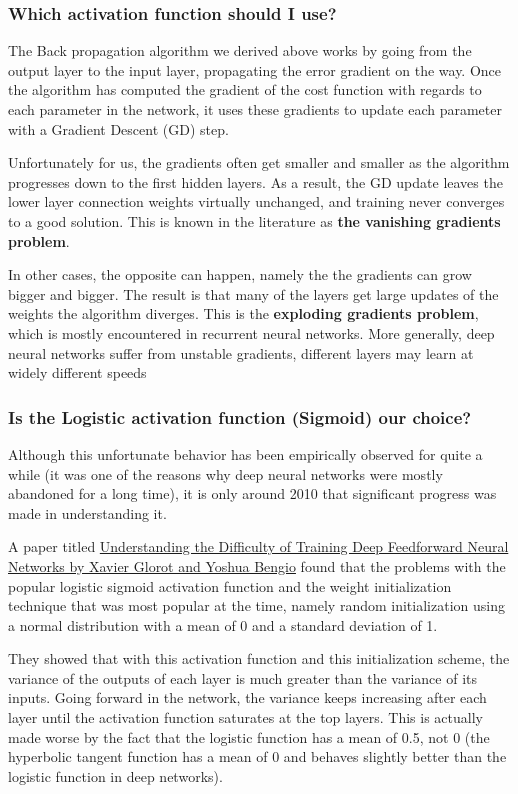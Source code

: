 \documentclass{beamer}
\begin{document}
\begin{frame}
\frametitle{Which activation function should I use?}

The Back propagation algorithm we derived above works by going from
the output layer to the input layer, propagating the error gradient on
the way. Once the algorithm has computed the gradient of the cost
function with regards to each parameter in the network, it uses these
gradients to update each parameter with a Gradient Descent (GD) step.

Unfortunately for us, the gradients often get smaller and smaller as
the algorithm progresses down to the first hidden layers. As a result,
the GD update leaves the lower layer connection weights virtually
unchanged, and training never converges to a good solution. This is
known in the literature as \textbf{the vanishing gradients problem}.

In other cases, the opposite can happen, namely the the gradients can
grow bigger and bigger. The result is that many of the layers get
large updates of the weights the algorithm diverges. This is the
\textbf{exploding gradients problem}, which is mostly encountered in
recurrent neural networks. More generally, deep neural networks suffer
from unstable gradients, different layers may learn at widely
different speeds
\end{frame}

\begin{frame}
\frametitle{Is the Logistic activation function (Sigmoid)  our choice?}

Although this unfortunate behavior has been empirically observed for
quite a while (it was one of the reasons why deep neural networks were
mostly abandoned for a long time), it is only around 2010 that
significant progress was made in understanding it.

A paper titled \href{{http://proceedings.mlr.press/v9/glorot10a.html}}{Understanding the Difficulty of Training Deep
Feedforward Neural Networks by Xavier Glorot and Yoshua Bengio} found that
the problems with the popular logistic
sigmoid activation function and the weight initialization technique
that was most popular at the time, namely random initialization using
a normal distribution with a mean of 0 and a standard deviation of
1. 

They showed that with this activation function and this
initialization scheme, the variance of the outputs of each layer is
much greater than the variance of its inputs. Going forward in the
network, the variance keeps increasing after each layer until the
activation function saturates at the top layers. This is actually made
worse by the fact that the logistic function has a mean of 0.5, not 0
(the hyperbolic tangent function has a mean of 0 and behaves slightly
better than the logistic function in deep networks).
\end{frame}
\end{document}
